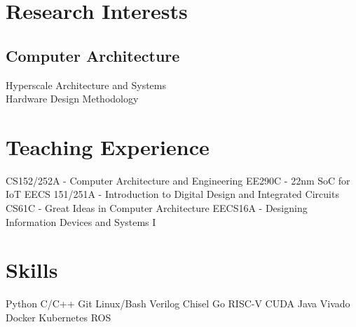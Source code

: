 \documentclass[]{deedy-resume-openfont}
\begin{document}
\begin{minipage}[t]{0.33\textwidth}

\section{Research Interests}
\subsection{Computer Architecture}

Hyperscale Architecture and Systems \\ 
Hardware Design Methodology

\smallsectionsep



\section{Teaching Experience}

CS152/252A - Computer Architecture and Engineering \textbullet{}
EE290C - 22nm SoC for IoT \textbullet{} 
EECS 151/251A -  Introduction to Digital Design
and Integrated Circuits \textbullet{}
CS61C - Great Ideas in Computer Architecture \textbullet{}
EECS16A - Designing Information Devices and Systems I

\smallsectionsep


\section{Skills}
Python \textbullet{} C/C++ \textbullet{} Git \textbullet{} Linux/Bash \textbullet{} Verilog \textbullet{} Chisel \textbullet{} Go \textbullet{} RISC-V \textbullet{} CUDA \textbullet{} Java \textbullet{} Vivado \textbullet{} Docker \textbullet{} Kubernetes \textbullet{} ROS %
\smallsectionsep



\end{minipage}
\end{document}
